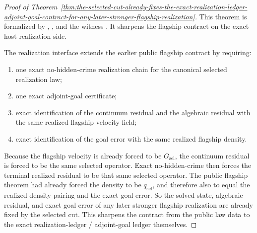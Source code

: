 \begin{proof}[Proof of Theorem~\ref{thm:the-selected-cut-already-fixes-the-exact-realization-ledger-adjoint-goal-contract-for-any-later-stronger-flagship-realization}]
\label{proof:thm:the-selected-cut-already-fixes-the-exact-realization-ledger-adjoint-goal-contract-for-any-later-stronger-flagship-realization}
This theorem is formalized by
,
, and the
witness
.
It sharpens the flagship contract on the exact host-realization side.

The realization interface extends the earlier public flagship contract by
requiring:
\begin{enumerate}
\item one exact no-hidden-crime realization chain for the canonical selected
      realization law;
\item one exact adjoint-goal certificate;
\item exact identification of the continuum residual and the algebraic
      residual with the same realized flagship velocity field;
\item exact identification of the goal error with the same realized flagship
      density.
\end{enumerate}
Because the flagship velocity is already forced to be \(G_{\mathrm{sel}}\),
the continuum residual is forced to be the same selected operator. Exact
no-hidden-crime then forces the terminal realized residual to be that same
selected operator. The public flagship theorem had already forced the density
to be \(q_{\mathrm{sel}}\), and therefore also to equal the realized density
pairing and the exact goal error. So the solved state, algebraic residual,
and exact goal error of any later stronger flagship realization are already
fixed by the selected cut. This sharpens the contract from the public law data
to the exact realization-ledger / adjoint-goal ledger themselves.
\end{proof}

